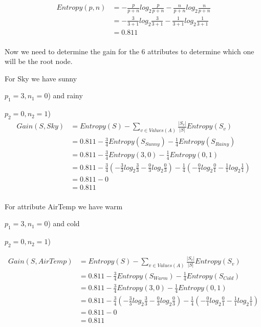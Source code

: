 \documentclass[10pt,a4paper]{article}
\begin{document}
\begin{equation}
\begin{split}
Entropy(p,n) &=  -\frac{p}{p+n}log_2\frac{p}{p+n} - \frac{n}{p+n}log_2\frac{n}{p+n}  \\
           &= -\frac{3}{3+1} log_2\frac{3}{3+1} -\frac{1}{3+1} log_2\frac{1}{3+1} \\
           &= 0.811   \\
\end{split}
\end{equation}

Now we need to determine the gain for the 6 attributes to determine which one will be the root node.

For Sky we have sunny {$p_1=3,n_1=0$) and rainy {$p_2=0,n_2=1$)
\begin{equation}
\begin{split}
\label{sky}
Gain(S,Sky) &= Entropy(S) - \sum_{v \in Values(A)} \frac{\vert S_v\vert}{\vert S\vert}Entropy(S_v) \\
          &= 0.811 - \frac{3}{4} Entropy(S_{Sunny} ) - \frac{1}{4}Entropy(S_{Rainy}) \\
          &= 0.811 - \frac{3}{4} Entropy(3,0) - \frac{1}{4}Entropy(0,1) \\
          &= 0.811 -\frac{3}{4} ( -\frac{3}{3} log_2\frac{3}{3} -\frac{0}{3} log_2\frac{0}{3} ) - \frac{1}{4}(-\frac{0}{1} log_2\frac{0}{1} - \frac{1}{1}log_2\frac{1}{1} ) \\
          &= 0.811 - 0\\
          &= 0.811 \\
\end{split}
\end{equation}

For attribute AirTemp we have warm {$p_1=3,n_1=0$) and cold {$p_2=0,n_2=1$)

\begin{equation}
\begin{split}
\label{airtemp}
Gain(S,AirTemp) &= Entropy(S) - \sum_{v \in Values(A)} \frac{\vert S_v\vert}{\vert S\vert}Entropy(S_v) \\
          &= 0.811 - \frac{3}{4} Entropy(S_{Warm} ) - \frac{1}{4}Entropy(S_{Cold}) \\
          &= 0.811 - \frac{3}{4} Entropy(3,0) - \frac{1}{4}Entropy(0,1) \\
          &= 0.811 -\frac{3}{4} ( -\frac{3}{3} log_2\frac{3}{3} -\frac{0}{3} log_2\frac{0}{3} ) - \frac{1}{4}(-\frac{0}{1} log_2\frac{0}{1} - \frac{1}{1}log_2\frac{1}{1} ) \\
          &= 0.811 - 0\\
          &= 0.811 \\
\end{split}
\end{equation}

}}}}
\end{document}
